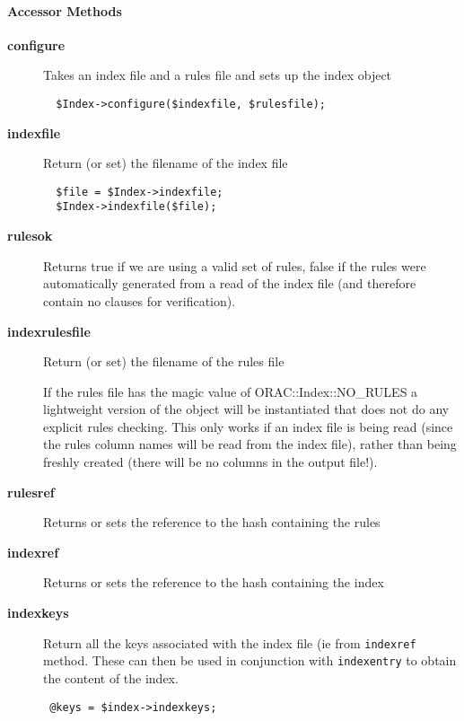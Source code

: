 \paragraph*{Accessor Methods\label{ORAC::Index_Accessor_Methods}}
\begin{description}

\item[{\textbf{configure}}] \mbox{}

Takes an index file and a rules file and sets up the index object

\begin{verbatim}
  $Index->configure($indexfile, $rulesfile);
\end{verbatim}

\item[{\textbf{indexfile}}] \mbox{}

Return (or set) the filename of the index file

\begin{verbatim}
  $file = $Index->indexfile;
  $Index->indexfile($file);
\end{verbatim}

\item[{\textbf{rulesok}}] \mbox{}

Returns true if we are using a valid set of rules, false
if the rules were automatically generated from a read of the
index file (and therefore contain no clauses for verification).


\item[{\textbf{indexrulesfile}}] \mbox{}

Return (or set) the filename of the rules file



If the rules file has the magic value of ORAC::Index::NO\_RULES a lightweight
version of the object will be instantiated that does not do any
explicit rules checking. This only works if an index file is being
read (since the rules column names will be read from the index file),
rather than being freshly created (there will be no columns in the
output file!).


\item[{\textbf{rulesref}}] \mbox{}

Returns or sets the reference to the hash containing the rules


\item[{\textbf{indexref}}] \mbox{}

Returns or sets the reference to the hash containing the index


\item[{\textbf{indexkeys}}] \mbox{}

Return all the keys associated with the index file (ie from \texttt{indexref}
method. These can then be used in conjunction with \texttt{indexentry} to obtain
the content of the index.

\begin{verbatim}
 @keys = $index->indexkeys;
\end{verbatim}
\end{description}
